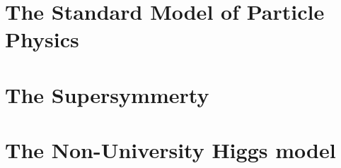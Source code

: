 \section{The Standard Model of Particle Physics}

\section{The Supersymmerty}

\section{The Non-University Higgs model}